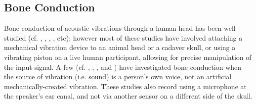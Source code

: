 \documentclass[dissertation,copyright]{uathesis}
\begin{document}
\subsection{Bone Conduction}
Bone conduction of acoustic vibrations through a human head has been well studied (cf. \cite{allen:60}, \cite{hakansson:94}, \cite{stenfelt:00}, \cite{reinfeldt:10}, etc); however most of these studies have involved attaching a mechanical vibration device to an animal head or a cadaver skull, or using a vibrating piston on a live human participant, allowing for precise manipulation of the input signal.  
% 
%
A few (cf. \cite{bekesy:48}, \cite{hansen:97b}, \cite{porschmann:00}, and \cite{reinfeldt:10}) have investigated bone conduction when the source of vibration (i.e. sound) is a person's own voice, not an artificial mechanically-created vibration.  These studies also record using a microphone at the speaker's ear canal, and not via another sensor on a different side of the skull.
\end{document}
